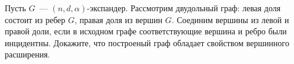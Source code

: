 Пусть $G$~--- $(n, d, \alpha)$-экспандер. Рассмотрим двудольный граф: левая доля состоит из ребер $G$, правая доля из вершин
$G$. Соединим вершины из левой и правой доли, если в исходном графе соответствующие вершина и ребро были
инцидентны. Докажите, что построеный граф обладает свойством вершинного расширения.